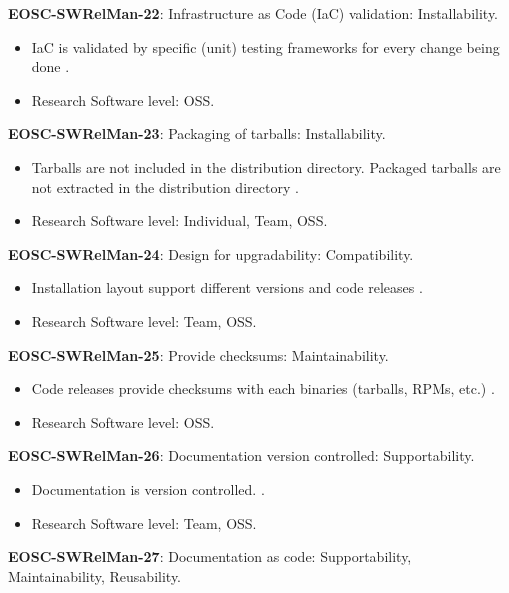 \textbf{EOSC-SWRelMan-22}: Infrastructure as Code (IaC) validation: Installability.

\begin{itemize}
    \item IaC is validated by specific (unit) testing frameworks for every change being done \cite{orviz_fernandez_eosc-synergy_2020}.
    \item Research Software level: OSS.
\end{itemize}

\textbf{EOSC-SWRelMan-23}: Packaging of tarballs: Installability.

\begin{itemize}
    \item Tarballs are not included in the distribution directory. Packaged tarballs are not extracted in the distribution directory \cite{raymond_software_2013}.
    \item Research Software level: Individual, Team, OSS.
\end{itemize}

\textbf{EOSC-SWRelMan-24}: Design for upgradability: Compatibility.

\begin{itemize}
    \item Installation layout support different versions and code releases \cite{raymond_software_2013}.
    \item Research Software level: Team, OSS.
\end{itemize}

\textbf{EOSC-SWRelMan-25}: Provide checksums: Maintainability.

\begin{itemize}
    \item Code releases provide checksums with each binaries (tarballs, RPMs, etc.) \cite{raymond_software_2013}.
    \item Research Software level: OSS.
\end{itemize}

\textbf{EOSC-SWRelMan-26}: Documentation version controlled: Supportability.

\begin{itemize}
    \item Documentation is version controlled. \cite{orviz_fernandez_eosc-synergy_2020}.
    \item Research Software level: Team, OSS.
\end{itemize}

\textbf{EOSC-SWRelMan-27}: Documentation as code: Supportability, Maintainability, Reusability.

